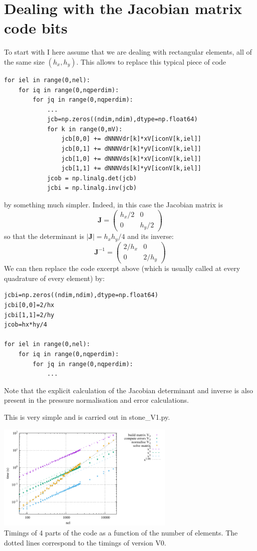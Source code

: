 \section*{Dealing with the Jacobian matrix code bits}

To start with I here assume that we are dealing with rectangular elements, 
all of the same size $(h_x,h_y)$. This allows to replace this typical piece of code 
\begin{lstlisting}
for iel in range(0,nel):
    for iq in range(0,nqperdim):
        for jq in range(0,nqperdim):
            ...
            jcb=np.zeros((ndim,ndim),dtype=np.float64)
            for k in range(0,mV):
                jcb[0,0] += dNNNVdr[k]*xV[iconV[k,iel]]
                jcb[0,1] += dNNNVdr[k]*yV[iconV[k,iel]]
                jcb[1,0] += dNNNVds[k]*xV[iconV[k,iel]]
                jcb[1,1] += dNNNVds[k]*yV[iconV[k,iel]]
            jcob = np.linalg.det(jcb)
            jcbi = np.linalg.inv(jcb)
\end{lstlisting}
by something much simpler. Indeed, in this case the Jacobian matrix is 
\[
{\bm J}=\left(
\begin{array}{cc}
h_x/2 & 0 \\ 0 & h_y/2
\end{array}
\right)
\]
so that the determinant is $|{\bm J}|=h_xh_y/4$ and its inverse:
\[
{\bm J}^{-1}
=\left(
\begin{array}{cc}
2/h_x & 0 \\ 0 & 2/h_y
\end{array}
\right)
\]
We can then replace the code excerpt above (which is usually called at every quadrature 
of every element) by:
\begin{lstlisting}
jcbi=np.zeros((ndim,ndim),dtype=np.float64)
jcbi[0,0]=2/hx
jcbi[1,1]=2/hy
jcob=hx*hy/4

for iel in range(0,nel):
    for iq in range(0,nqperdim):
        for jq in range(0,nqperdim):
            ...

\end{lstlisting}
Note that the explicit calculation of the Jacobian determinant and inverse
is also present in the pressure normalisation and error calculations.

This is very simple and 
is carried out in {\pythonfile stone\_V1.py}.

\begin{center}
\includegraphics[width=8.5cm]{python_codes/fieldstone_150/results/times_V1}\\
{\captionfont Timings of 4 parts of the code as a function of the number of elements.
The dotted lines correspond to the timings of version V0.}
\end{center}

